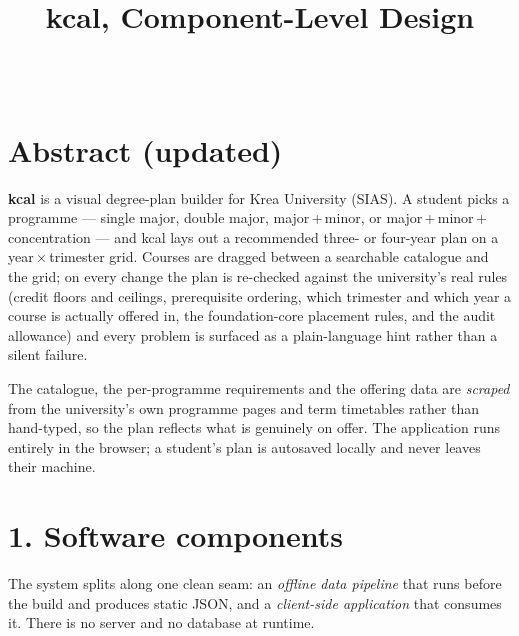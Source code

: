 \documentclass[11pt,a4paper]{article}
\title{\vspace{-1.4cm}\textbf{kcal}, Component-Level Design\\
  \large \coursename}
\author{\groupname\\ \small \groupmembers}
\date{\submissiondate}
\begin{document}
\maketitle
\vspace{-0.6cm}

\section*{Abstract (updated)}

\textbf{kcal} is a visual degree-plan builder for Krea University (SIAS).
A student picks a programme --- single major, double major, major\,+\,minor, or
major\,+\,minor\,+\,concentration --- and kcal lays out a recommended three- or
four-year plan on a year\,$\times$\,trimester grid. Courses are dragged between a
searchable catalogue and the grid; on every change the plan is re-checked against
the university's real rules (credit floors and ceilings, prerequisite ordering,
which trimester and which year a course is actually offered in, the foundation-core
placement rules, and the audit allowance) and every problem is surfaced as a
plain-language hint rather than a silent failure.

The catalogue, the per-programme requirements and the offering data are
\emph{scraped} from the university's own programme pages and term timetables rather
than hand-typed, so the plan reflects what is genuinely on offer. The application
runs entirely in the browser; a student's plan is autosaved locally and never leaves
their machine.

\section*{1. Software components}

The system splits along one clean seam: an \emph{offline data pipeline} that runs
before the build and produces static JSON, and a \emph{client-side application} that
consumes it. There is no server and no database at runtime.
\end{document}
